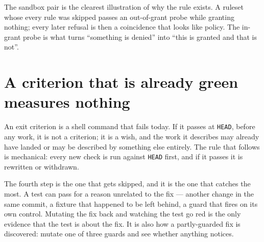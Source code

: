 The sandbox pair is the clearest illustration of why the rule exists. A ruleset whose every
rule was skipped passes an out-of-grant probe while granting nothing; every later refusal is
then a coincidence that looks like policy. The in-grant probe is what turns ``something is
denied'' into ``this is granted and that is not''.

\section{A criterion that is already green measures nothing}

An exit criterion is a shell command that fails today. If it passes at \texttt{HEAD}, before
any work, it is not a criterion; it is a wish, and the work it describes may already have
landed or may be described by something else entirely. The rule that follows is mechanical:
every new check is run against \texttt{HEAD} first, and if it passes it is rewritten or
withdrawn.

\begin{center}
\end{center}

The fourth step is the one that gets skipped, and it is the one that catches the most. A test
can pass for a reason unrelated to the fix --- another change in the same commit, a fixture
that happened to be left behind, a guard that fires on its own control. Mutating the fix back
and watching the test go red is the only evidence that the test is about the fix. It is also
how a partly-guarded fix is discovered: mutate one of three guards and see whether anything
notices.

